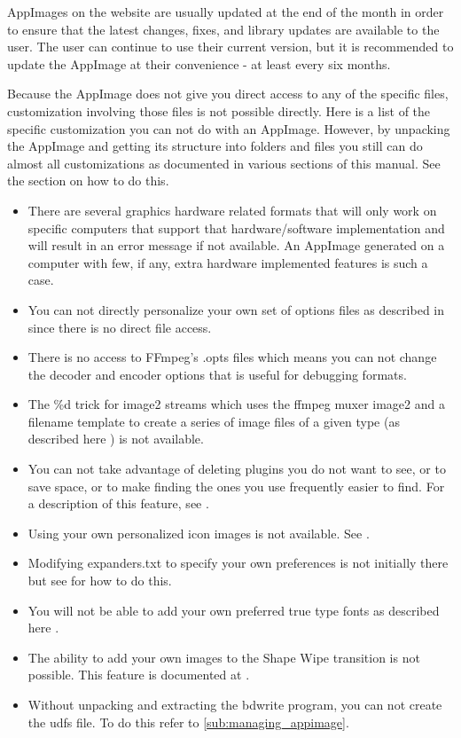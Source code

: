 AppImages on the website are usually updated at the end of the month in order
to ensure that the latest changes, fixes, and library updates are available to the
user. The user can continue to use their current version, but it is recommended to
update the AppImage at their convenience - at least every six months.

Because the AppImage does not give you direct access to any of the specific \CGG{}
files, customization involving those files is not possible directly.  Here is a
list of the specific customization you can not do with an AppImage. However, by
unpacking the AppImage and getting its structure into folders and files you still
can do almost all customizations as documented in various sections of this manual.
See the section  on how to do this. 

\begin{itemize}[nosep]
\item There are several graphics hardware related formats that will only work on
specific computers that support that hardware/software implementation and will 
result in an error message if not available. An AppImage generated on a computer
with few, if any, extra hardware implemented features is such a case.
\item You can not directly personalize your own set of options files as described in
 since there is no direct file access.
\item There is no access to FFmpeg's .opts files which means you can not change the
decoder and encoder options that is useful for debugging formats.
\item The \%d trick for image2 streams which uses the ffmpeg muxer image2 and a
filename template to create a series of image files of a given type (as described
here ) is not available.
\item You can not take advantage of deleting plugins you do not want to see, or to
save space, or to make finding the ones you use frequently easier to find. For
a description of this feature, see .
\item Using your own personalized icon images is not available. See .
\item Modifying expanders.txt to specify your own preferences is not initially there
but see  for how to do this.
\item You will not be able to add your own preferred true type fonts as described here
.
\item The ability to add your own images to the Shape Wipe transition is not
possible. This feature is documented at .
\item Without unpacking and extracting the bdwrite program, you can not create the
udfs file. To do this refer to \ref{sub:managing_appimage}.
\end{itemize}

